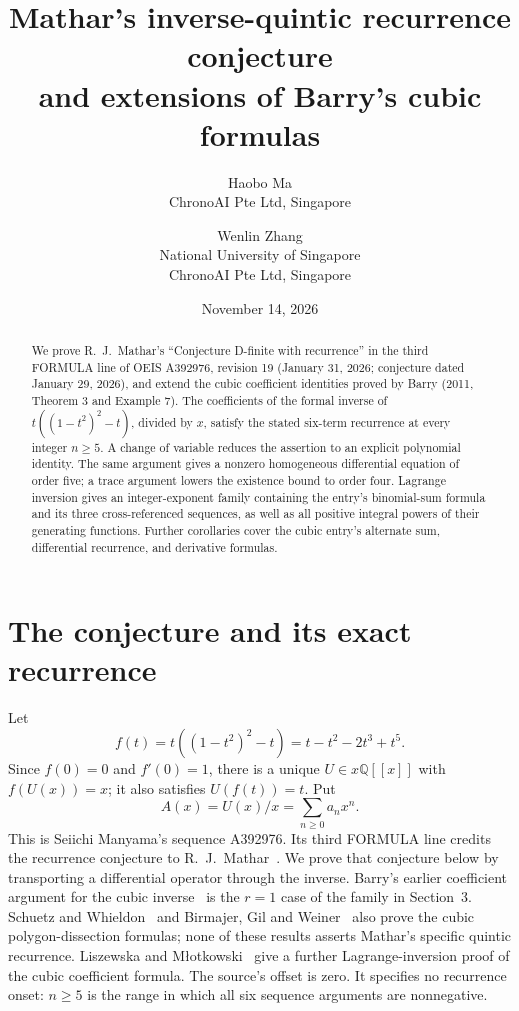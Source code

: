 \documentclass[10pt]{article}
\title{Mathar's inverse-quintic recurrence conjecture\\
and extensions of Barry's cubic formulas}
\author{Haobo Ma\\\small ChronoAI Pte Ltd, Singapore
\and Wenlin Zhang\\\small National University of Singapore\\\small ChronoAI Pte Ltd, Singapore}
\date{November 14, 2026}
\newcommand{\Q}{\mathbb{Q}}
\begin{document}
\maketitle
\begin{abstract}
We prove R.\ J.\ Mathar's ``Conjecture D-finite with recurrence'' in the third
FORMULA line of OEIS A392976, revision 19 (January 31, 2026; conjecture dated
January 29, 2026), and extend the cubic coefficient identities proved by
Barry (2011, Theorem 3 and Example 7). The coefficients of the formal inverse of
$t((1-t^2)^2-t)$, divided by $x$, satisfy the stated six-term recurrence at
every integer $n\geq5$. A change of variable reduces the assertion to an
explicit polynomial identity. The same argument gives a nonzero homogeneous
differential equation of order five; a trace argument lowers the existence
bound to order four. Lagrange inversion gives an integer-exponent
family containing the entry's binomial-sum formula and its three cross-referenced
sequences, as well as all positive integral powers of their generating functions.
Further corollaries cover the cubic entry's alternate sum, differential recurrence,
and derivative formulas.
\end{abstract}

\section{The conjecture and its exact recurrence}

Let
\[
 f(t)=t((1-t^2)^2-t)=t-t^2-2t^3+t^5.
\]
Since $f(0)=0$ and $f'(0)=1$, there is a unique $U\in x\Q[[x]]$
with $f(U(x))=x$; it also satisfies $U(f(t))=t$. Put
\[
 A(x)=U(x)/x=\sum_{n\geq0}a_nx^n.
\]
This is Seiichi Manyama's sequence A392976. Its third FORMULA line credits
the recurrence conjecture to R.\ J.\ Mathar~\cite{oeis}.
We prove that conjecture below by transporting a differential operator
through the inverse. Barry's earlier coefficient argument for the cubic
inverse~\cite[Theorem 3 and Example 7]{barry} is the $r=1$ case of the
family in Section~3. Schuetz and Whieldon~\cite[Theorem 1.9 and Section 3]{sw}
and Birmajer, Gil and Weiner~\cite[Section 4]{bgw} also prove the
cubic polygon-dissection formulas; none of these results asserts Mathar's
specific quintic recurrence.
Liszewska and M\l{}otkowski~\cite[Proposition 6.1, equation (19)]{lm}
give a further Lagrange-inversion proof of the cubic coefficient formula.
The source's offset is zero. It specifies no recurrence onset: $n\geq5$
is the range in which all six sequence arguments are nonnegative.
\end{document}
